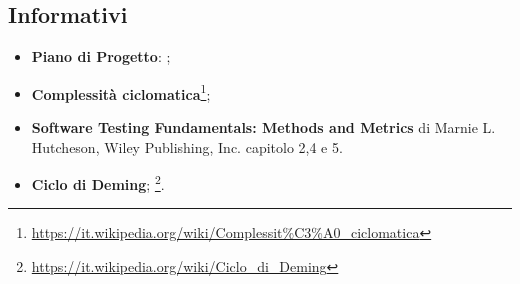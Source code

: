 \subsection{Informativi}
\label{RiferimentiInformativi}
\begin{itemize}\label{rfinf}
	\item \textbf{Piano di Progetto}: \pianodiprogetto;
	\item \textbf{Complessità ciclomatica}\footnote{\url{https://it.wikipedia.org/wiki/Complessit\%C3\%A0_ciclomatica}};
	\item \textbf{Software Testing Fundamentals: Methods and Metrics} di Marnie L. Hutcheson, Wiley Publishing, Inc. capitolo 2,4 e 5.
	\item \textbf{Ciclo di Deming};
	\footnote{\url{https://it.wikipedia.org/wiki/Ciclo_di_Deming}}.
\end{itemize}
